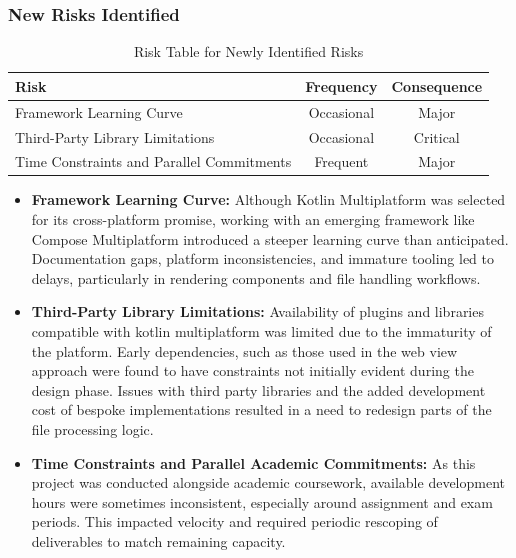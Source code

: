\subsubsection{New Risks Identified}

\begin{table}[h]
\centering
\caption{Risk Table for Newly Identified Risks}

\begin{tabular}{|l|c|c|}
\hline
\textbf{Risk}                           & \textbf{Frequency} & \textbf{Consequence} \\
\hline
\rowcolor{yellow!50} Framework Learning Curve        & Occasional        & Major                 \\
\hline
\rowcolor{yellow!50} Third-Party Library Limitations        & Occasional        & Critical                 \\
\hline
\rowcolor{red!50} Time Constraints and Parallel Commitments        & Frequent        & Major                 \\

\hline
\end{tabular}
\label{tab:ProjRisks}
\end{table}

\begin{itemize}
    \item \textbf{Framework Learning Curve:}  
    Although Kotlin Multiplatform was selected for its cross-platform promise, working with an emerging framework like Compose Multiplatform introduced a steeper learning curve than anticipated. Documentation gaps, platform inconsistencies, and immature tooling led to delays, particularly in rendering components and file handling workflows.

    \item \textbf{Third-Party Library Limitations:}  
    Availability of plugins and libraries compatible with kotlin multiplatform was limited due to the immaturity of the platform. Early dependencies, such as those used in the web view approach were found to have constraints not initially evident during the design phase. Issues with third party libraries and the added development cost of bespoke implementations resulted in a need to redesign parts of the file processing logic.

    \item \textbf{Time Constraints and Parallel Academic Commitments:}  
    As this project was conducted alongside academic coursework, available development hours were sometimes inconsistent, especially around assignment and exam periods. This impacted velocity and required periodic rescoping of deliverables to match remaining capacity.
\end{itemize}

